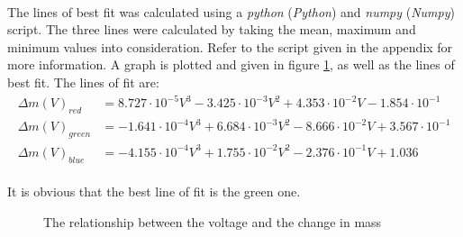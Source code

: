 \documentclass[a4paper]{article}
\begin{document}
\paragraph*{}
The lines of best fit was calculated using a \textit{python} (\textit{Python})
and \textit{numpy} (\textit{Numpy}) script. The three lines were calculated by
taking the mean, maximum and minimum values into consideration. Refer to the
script given in the appendix for more information. A graph is plotted and given
in figure \ref{fig:voltage-delta}, as well as the lines of best fit. The lines
of fit are:
\begin{align*}
  \Delta m (V)_{red} &= 8.727 \cdot 10^{-5} V^3 - 3.425 \cdot 10^{-3} V^2 +
  4.353 \cdot 10^{-2} V - 1.854 \cdot 10^{-1} \\
  \Delta m (V)_{green} &= -1.641 \cdot 10^{-4} V^3 + 6.684 \cdot 10^{-3} V^2 -
  8.666 \cdot 10^{-2} V + 3.567 \cdot 10^{-1} \\
  \Delta m (V)_{blue} &= -4.155 \cdot 10^{-4} V^3 + 1.755 \cdot 10^{-2} V^2 -
  2.376 \cdot 10^{-1} V + 1.036
\end{align*}

\paragraph*{}
It is obvious that the best line of fit is the green one.

\begin{figure}[ht]
  \centering
  \caption{The relationship between the voltage and the change in mass}
  \label{fig:voltage-delta}
\end{figure}
\end{document}
